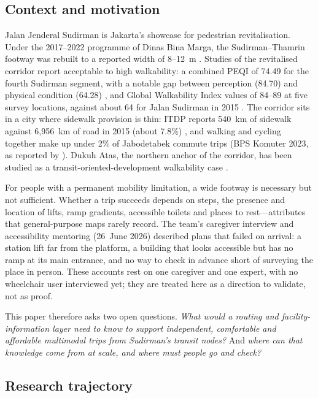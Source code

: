 \documentclass[11pt,a4paper]{article}
\begin{document}
\subsection{Context and motivation}

Jalan Jenderal Sudirman is Jakarta's showcase for pedestrian revitalisation. Under the 2017--2022
programme of Dinas Bina Marga, the Sudirman--Thamrin footway was rebuilt to a reported width of
8--12~m \cite{beritajakarta2019}. Studies of the revitalised corridor report acceptable to high
walkability: a combined PEQI of 74.49 for the fourth Sudirman segment, with a notable gap between
perception (84.70) and physical condition (64.28) \cite{dwisadana2024}, and Global Walkability Index
values of 84--89 at five survey locations, against about 64 for Jalan Sudirman in 2015
\cite{mulyadi2022,ridhani2015}. The corridor sits in a city where sidewalk provision is thin: ITDP
reports 540~km of sidewalk against 6,956~km of road in 2015 (about 7.8\%) \cite{itdp2019}, and
walking and cycling together make up under 2\% of Jabodetabek commute trips (BPS Komuter 2023, as
reported by \cite{goodstats2024}). Dukuh Atas, the northern anchor of the corridor, has been studied
as a transit-oriented-development walkability case \cite{rakhmatulloh2020,napitupulu2025tod}.

For people with a permanent mobility limitation, a wide footway is necessary but not sufficient.
Whether a trip succeeds depends on steps, the presence and location of lifts, ramp gradients,
accessible toilets and places to rest---attributes that general-purpose maps rarely record. The
team's caregiver interview and accessibility mentoring (26~June 2026) described plans that failed on
arrival: a station lift far from the platform, a building that looks accessible but has no ramp at its
main entrance, and no way to check in advance short of surveying the place in person. These
accounts rest on one caregiver and one expert, with no wheelchair user interviewed yet; they are
treated here as a direction to validate, not as proof.

This paper therefore asks two open questions. \emph{What would a routing and facility-information
layer need to know to support independent, comfortable and affordable multimodal trips from
Sudirman's transit nodes?} And \emph{where can that knowledge come from at scale, and where must
people go and check?}

\subsection{Research trajectory}
\end{document}
